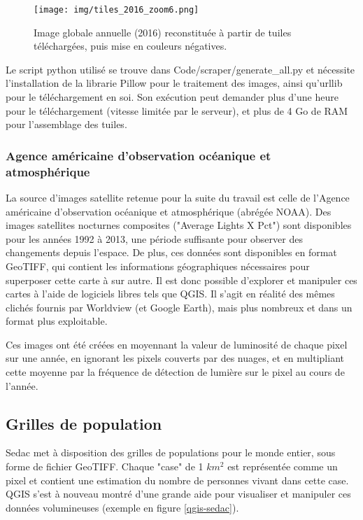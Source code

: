 \documentclass[a4paper]{report}
\begin{document}
\begin{figure}[h]
	\centering
	\texttt{[image: img/tiles\_2016\_zoom6.png]}
	\caption{Image globale annuelle (2016) reconstituée à partir de tuiles téléchargées, puis mise en couleurs négatives.}
	\label{nasa-worldview-tiles}
\end{figure}

Le script python utilisé se trouve dans Code/scraper/generate\_all.py et nécessite l'installation de la librarie Pillow pour le traitement des images, ainsi qu'urllib pour le téléchargement en soi. Son exécution peut demander plus d'une heure pour le téléchargement (vitesse limitée par le serveur), et plus de 4 Go de RAM pour l'assemblage des tuiles.

\subsubsection{Agence américaine d'observation océanique et atmosphérique}
La source d'images satellite retenue pour la suite du travail est celle de l'Agence américaine d'observation océanique et atmosphérique (abrégée NOAA)\cite{noaa}. Des images satellites nocturnes composites ("Average Lights X Pct") sont disponibles pour les années 1992 à 2013, une période suffisante pour observer des changements depuis l'espace. De plus, ces données sont disponibles en format GeoTIFF, qui contient les informations géographiques nécessaires pour superposer cette carte à sur autre. Il est donc possible d'explorer et manipuler ces cartes à l'aide de logiciels libres tels que QGIS. Il s'agit en réalité des mêmes clichés fournis par Worldview (et Google Earth), mais plus nombreux et dans un format plus exploitable.

Ces images ont été créées en moyennant la valeur de luminosité de chaque pixel sur une année, en ignorant les pixels couverts par des nuages, et en multipliant cette moyenne par la fréquence de détection de lumière sur le pixel au cours de l'année.

\subsection{Grilles de population}
Sedac \cite{sedac} met à disposition des grilles de populations pour le monde entier, sous forme de fichier GeoTIFF. Chaque "case" de 1 $km^2$ est représentée comme un pixel et contient une estimation du nombre de personnes vivant dans cette case. QGIS s'est à nouveau montré d'une grande aide pour visualiser et manipuler ces données volumineuses (exemple en figure \ref{qgis-sedac}).
\end{document}
